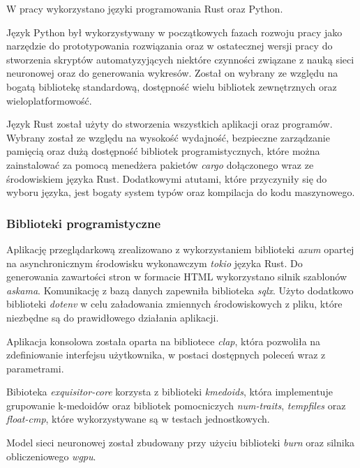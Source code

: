             W pracy wykorzystano języki programowania Rust\cite{Rust} oraz Python\cite{Python}.
            
            Język Python był wykorzystywany w początkowych fazach rozwoju pracy jako narzędzie do prototypowania rozwiązania oraz w ostatecznej wersji pracy do stworzenia skryptów automatyzyjących niektóre czynności związane z nauką sieci neuronowej oraz do generowania wykresów. Został on wybrany ze względu na bogatą bibliotekę standardową, dostępność wielu bibliotek zewnętrznych oraz wieloplatformowość.
            
            Język Rust został użyty do stworzenia wszystkich aplikacji oraz programów. Wybrany został ze względu na wysokość wydajność, bezpieczne zarządzanie pamięcią oraz dużą dostępność bibliotek programistycznych, które można zainstalować za pomocą menedżera pakietów \textit{cargo}\cite{Rust:cargo} dołączonego wraz ze środowiskiem języka Rust. Dodatkowymi atutami, które przyczyniły się do wyboru języka, jest bogaty system typów oraz kompilacja do kodu maszynowego. 

        \subsubsection{Biblioteki programistyczne}

            Aplikację przeglądarkową zrealizowano z wykorzystaniem biblioteki \textit{axum}\cite{Rust:axum} opartej na asynchronicznym środowisku wykonawczym \textit{tokio}\cite{Rust:tokio} języka Rust.
            Do generowania zawartości stron w formacie HTML wykorzystano silnik szablonów \textit{askama}\cite{Rust:askama}. Komunikację z bazą danych zapewniła biblioteka \textit{sqlx}\cite{Rust:sqlx}. Użyto dodatkowo biblioteki \textit{dotenv}\cite{Rust:dotenv} w celu załadowania zmiennych środowiskowych z pliku, które niezbędne są do prawidłowego działania aplikacji.

            Aplikacja konsolowa została oparta na bibliotece \textit{clap}\cite{Rust:clap}, która pozwoliła na zdefiniowanie interfejsu użytkownika, w postaci dostępnych poleceń wraz z parametrami.

            Bibioteka \textit{exquisitor-core} korzysta z biblioteki \textit{kmedoids}\cite{Schubert:2022}, która implementuje grupowanie k-medoidów oraz bibliotek pomocniczych \textit{num-traits}, \textit{tempfiles} oraz \textit{float-cmp}, które wykorzystywane są w testach jednostkowych.

            Model sieci neuronowej został zbudowany przy użyciu biblioteki \textit{burn}\cite{Rust:burn} oraz silnika obliczeniowego \textit{wgpu}.

